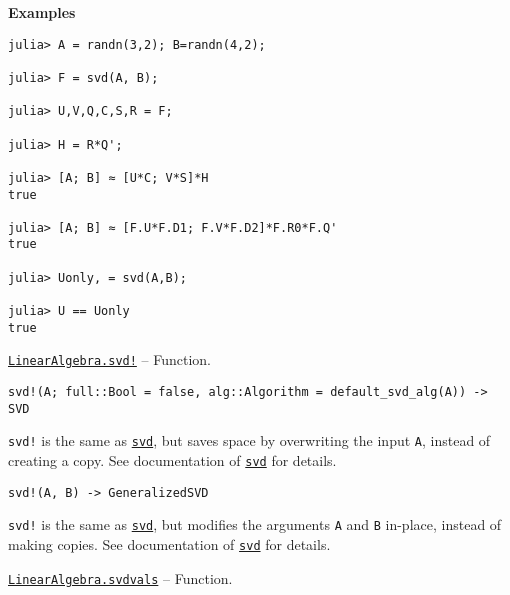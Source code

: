 \begin{adjustwidth}{2em}{0pt}
\textbf{Examples}


\begin{verbatim}
julia> A = randn(3,2); B=randn(4,2);

julia> F = svd(A, B);

julia> U,V,Q,C,S,R = F;

julia> H = R*Q';

julia> [A; B] ≈ [U*C; V*S]*H
true

julia> [A; B] ≈ [F.U*F.D1; F.V*F.D2]*F.R0*F.Q'
true

julia> Uonly, = svd(A,B);

julia> U == Uonly
true
\end{verbatim}



\end{adjustwidth}
\hypertarget{7585497127906495351}{}
\hyperlink{7585497127906495351}{\texttt{LinearAlgebra.svd!}}  -- {Function.}

\begin{adjustwidth}{2em}{0pt}


\begin{verbatim}
svd!(A; full::Bool = false, alg::Algorithm = default_svd_alg(A)) -> SVD
\end{verbatim}

\texttt{svd!} is the same as \hyperlink{6661056220970412040}{\texttt{svd}}, but saves space by overwriting the input \texttt{A}, instead of creating a copy. See documentation of \hyperlink{6661056220970412040}{\texttt{svd}} for details.




\begin{lstlisting}
svd!(A, B) -> GeneralizedSVD
\end{lstlisting}

\texttt{svd!} is the same as \hyperlink{6661056220970412040}{\texttt{svd}}, but modifies the arguments \texttt{A} and \texttt{B} in-place, instead of making copies. See documentation of \hyperlink{6661056220970412040}{\texttt{svd}} for details.



\end{adjustwidth}
\hypertarget{12905968661134086149}{}
\hyperlink{12905968661134086149}{\texttt{LinearAlgebra.svdvals}}  -- {Function.}

